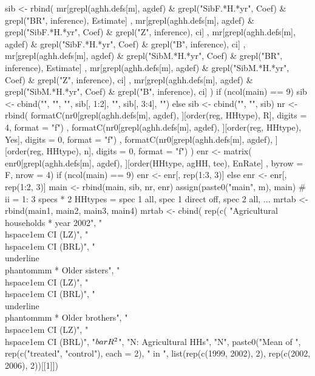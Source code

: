 \begin{Schunk}
\begin{Sinput}
{{{      sib <-  rbind(
         mr[grepl(aghh.defs[m], agdef)  & grepl("SibF.*H.*yr", Coef) & grepl("BR", inference), Estimate]
         , 
         mr[grepl(aghh.defs[m], agdef) & grepl("SibF.*H.*yr", Coef) & grepl("Z", inference), ci]
         ,
         mr[grepl(aghh.defs[m], agdef) & grepl("SibF.*H.*yr", Coef) & grepl("B", inference), ci]
         ,
         mr[grepl(aghh.defs[m], agdef) & grepl("SibM.*H.*yr", Coef) & grepl("BR", inference), Estimate]
         , 
         mr[grepl(aghh.defs[m], agdef) & grepl("SibM.*H.*yr", Coef) & grepl("Z", inference), ci]
         ,
         mr[grepl(aghh.defs[m], agdef) & grepl("SibM.*H.*yr", Coef) & grepl("B", inference), ci]
       )
       if (ncol(main) == 9) 
         sib <- cbind("", "", "", sib[, 1:2], "", sib[, 3:4], "") else
         sib <- cbind("", "", sib)
       nr <- rbind(
          formatC(nr0[grepl(aghh.defs[m], agdef), ][order(reg, HHtype), R], digits = 4, format = "f")
        , formatC(nr0[grepl(aghh.defs[m], agdef), ][order(reg, HHtype), Yes], digits = 0, format = "f")
        , formatC(nr0[grepl(aghh.defs[m], agdef), ][order(reg, HHtype), n], digits = 0, format = "f")
       )
       enr <- matrix(
         enr0[grepl(aghh.defs[m], agdef), ][order(HHtype, agHH, tee), EnRate]
         , byrow = F, nrow = 4)
       if (ncol(main) == 9) enr <- enr[, rep(1:3, 3)] else enr <- enr[, rep(1:2, 3)]
       main <- rbind(main, sib, nr, enr)
       assign(paste0("main", m), main)
    }
    # ii = 1: 3 specs * 2 HHtypes = spec 1 all, spec 1 direct off, spec 2 all, ...
    mrtab <- rbind(main1, main2, main3, main4)
    mrtab <- 
      cbind(
          rep(c(
            "Agricultural households * year 2002", 
            "\\hspace{1em} CI (LZ)", "\\hspace{1em} CI (BRL)", 
            "\\underline{\\phantom{mm}} * Older sisters",
            "\\hspace{1em} CI (LZ)", "\\hspace{1em} CI (BRL)", 
            "\\underline{\\phantom{mm}} * Older brothers",
            "\\hspace{1em} CI (LZ)", "\\hspace{1em} CI (BRL)", 
            "$\\bar{R}^{2}$", "N: Agricultural HHs", "N",
            paste0("Mean of ", rep(c("treated", "control"), each = 2), " in ", 
              list(rep(c(1999, 2002), 2), rep(c(2002, 2006), 2))[[1]])
}}
\end{Sinput}
\end{Schunk}

